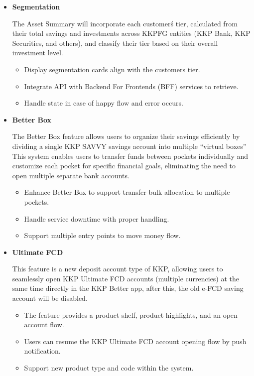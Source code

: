 \documentclass[12pt,oneside,openright,a4paper]{cpe-english-project}
\begin{document}
\begin{itemize}
\item \textbf{Segmentation}

The Asset Summary will incorporate each customer\'s tier, calculated from
their total savings and investments across KKPFG entities (KKP Bank, KKP
Securities, and others), and classify their tier based on their overall
investment level.

  \begin{itemize}
  \item Display segmentation cards align with the customer\textquotesingle s tier.
  \item Integrate API with Backend For Frontends (BFF) services to retrieve.
  \item Handle state in case of happy flow and error occurs.
  \end{itemize}

\item \textbf{Better Box}

The Better Box feature allows users to organize their savings
efficiently by dividing a single KKP SAVVY savings account into multiple
``virtual boxes'' This system enables users to transfer funds between
pockets individually and customize each pocket for specific financial
goals, eliminating the need to open multiple separate bank accounts.

  \begin{itemize}
  \item Enhance Better Box to support transfer bulk allocation to multiple pockets.
  \item Handle service downtime with proper handling.
  \item Support multiple entry points to move money flow.
  \end{itemize}

\item \textbf{Ultimate FCD}

This feature is a new deposit account type of KKP, allowing users to
seamlessly open KKP Ultimate FCD accounts (multiple currencies) at the
same time directly in the KKP Better app, after this, the old e-FCD
saving account will be disabled.

  \begin{itemize}
  \item The feature provides a product shelf, product highlights, and an open account flow.
  \item Users can resume the KKP Ultimate FCD account opening flow by push notification.
  \item Support new product type and code within the system.
  \end{itemize}

\end{itemize}
\end{document}
